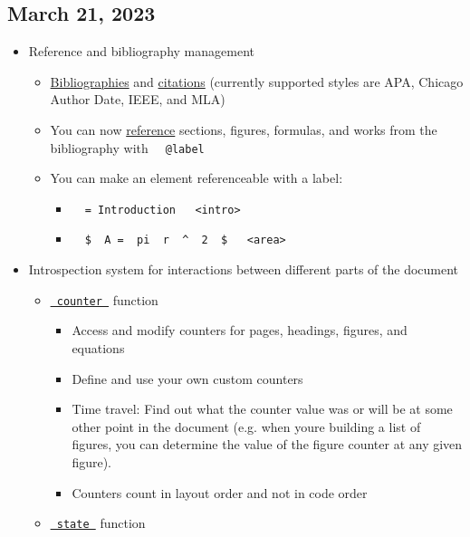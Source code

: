 \subsection{March 21, 2023}\label{march-21-2023}

\begin{itemize}
\item
  Reference and bibliography management

  \begin{itemize}
  \tightlist
  \item
    \href{/docs/reference/model/bibliography/}{Bibliographies} and
    \href{/docs/reference/model/cite/}{citations} (currently supported
    styles are APA, Chicago Author Date, IEEE, and MLA)
  \item
    You can now \href{/docs/reference/model/ref/}{reference} sections,
    figures, formulas, and works from the bibliography with
    \texttt{\ }{\texttt{\ @label\ }}\texttt{\ }
  \item
    You can make an element referenceable with a label:

    \begin{itemize}
    \tightlist
    \item
      \texttt{\ }{\texttt{\ =\ Introduction\ }}\texttt{\ }{\texttt{\ \textless{}intro\textgreater{}\ }}\texttt{\ }
    \item
      \texttt{\ }{\texttt{\ \$\ }}\texttt{\ A\ =\ }{\texttt{\ pi\ }}\texttt{\ r\ }{\texttt{\ \^{}\ }}\texttt{\ 2\ }{\texttt{\ \$\ }}\texttt{\ }{\texttt{\ \textless{}area\textgreater{}\ }}\texttt{\ }
    \end{itemize}
  \end{itemize}
\item
  Introspection system for interactions between different parts of the
  document

  \begin{itemize}
  \tightlist
  \item
    \href{/docs/reference/introspection/counter/}{\texttt{\ counter\ }}
    function

    \begin{itemize}
    \tightlist
    \item
      Access and modify counters for pages, headings, figures, and
      equations
    \item
      Define and use your own custom counters
    \item
      Time travel: Find out what the counter value was or will be at
      some other point in the document (e.g. when you\textquotesingle re
      building a list of figures, you can determine the value of the
      figure counter at any given figure).
    \item
      Counters count in layout order and not in code order
    \end{itemize}
  \item
    \href{/docs/reference/introspection/state/}{\texttt{\ state\ }}
    function


\end{itemize}
\end{itemize}
